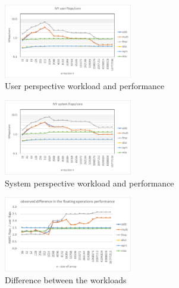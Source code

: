 \documentclass[conference]{IEEEtran}
\begin{document}
\begin{figure}[tb]
\includegraphics[width=0.5\textwidth]{figs/workload-ivy-user.pdf}
\caption{User perspective workload and performance}
\label{fig:workload-user}
\end{figure}
\begin{figure}[tb]
\includegraphics[width=0.5\textwidth]{figs/workload-ivy-system.pdf}
\caption{System perspective workload and performance}
\label{fig:workload-system}
\end{figure}
%
\begin{figure}[tb]
\includegraphics[width=0.5\textwidth]{figs/workload-ivy-difference.pdf}
\caption{Difference between the workloads}
\label{fig:workload-difference}
\end{figure}
\end{document}
